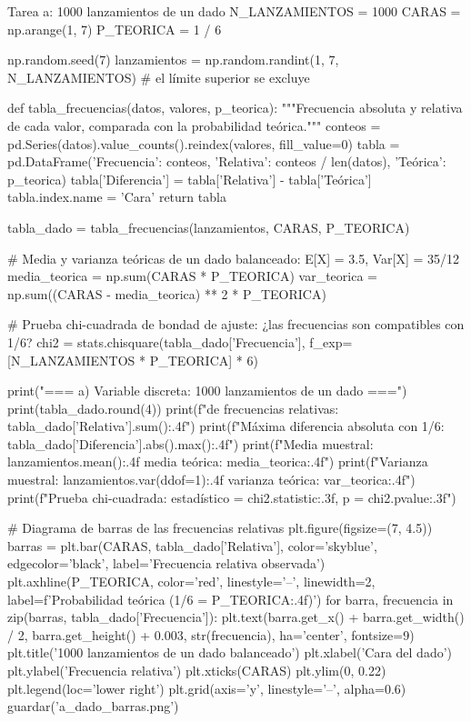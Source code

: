 \documentclass[11pt,letterpaper]{article}
\begin{document}
\begin{codigo}[label=cod:a]{Tarea a: 1000 lanzamientos de un dado}
N_LANZAMIENTOS = 1000
CARAS = np.arange(1, 7)
P_TEORICA = 1 / 6

np.random.seed(7)
lanzamientos = np.random.randint(1, 7, N_LANZAMIENTOS)  # el límite superior se excluye


def tabla_frecuencias(datos, valores, p_teorica):
    """Frecuencia absoluta y relativa de cada valor, comparada con la probabilidad teórica."""
    conteos = pd.Series(datos).value_counts().reindex(valores, fill_value=0)
    tabla = pd.DataFrame({'Frecuencia': conteos,
                          'Relativa': conteos / len(datos),
                          'Teórica': p_teorica})
    tabla['Diferencia'] = tabla['Relativa'] - tabla['Teórica']
    tabla.index.name = 'Cara'
    return tabla


tabla_dado = tabla_frecuencias(lanzamientos, CARAS, P_TEORICA)

# Media y varianza teóricas de un dado balanceado: E[X] = 3.5, Var[X] = 35/12
media_teorica = np.sum(CARAS * P_TEORICA)
var_teorica = np.sum((CARAS - media_teorica) ** 2 * P_TEORICA)

# Prueba chi-cuadrada de bondad de ajuste: ¿las frecuencias son compatibles con 1/6?
chi2 = stats.chisquare(tabla_dado['Frecuencia'], f_exp=[N_LANZAMIENTOS * P_TEORICA] * 6)

print("=== a) Variable discreta: 1000 lanzamientos de un dado ===")
print(tabla_dado.round(4))
print(f"\nSuma de frecuencias relativas: {tabla_dado['Relativa'].sum():.4f}")
print(f"Máxima diferencia absoluta con 1/6: {tabla_dado['Diferencia'].abs().max():.4f}")
print(f"Media muestral: {lanzamientos.mean():.4f}   media teórica: {media_teorica:.4f}")
print(f"Varianza muestral: {lanzamientos.var(ddof=1):.4f}   varianza teórica: {var_teorica:.4f}")
print(f"Prueba chi-cuadrada: estadístico = {chi2.statistic:.3f}, p = {chi2.pvalue:.3f}")

# Diagrama de barras de las frecuencias relativas
plt.figure(figsize=(7, 4.5))
barras = plt.bar(CARAS, tabla_dado['Relativa'], color='skyblue', edgecolor='black',
                 label='Frecuencia relativa observada')
plt.axhline(P_TEORICA, color='red', linestyle='--', linewidth=2,
            label=f'Probabilidad teórica (1/6 = {P_TEORICA:.4f})')
for barra, frecuencia in zip(barras, tabla_dado['Frecuencia']):
    plt.text(barra.get_x() + barra.get_width() / 2, barra.get_height() + 0.003,
             str(frecuencia), ha='center', fontsize=9)
plt.title('1000 lanzamientos de un dado balanceado')
plt.xlabel('Cara del dado')
plt.ylabel('Frecuencia relativa')
plt.xticks(CARAS)
plt.ylim(0, 0.22)
plt.legend(loc='lower right')
plt.grid(axis='y', linestyle='--', alpha=0.6)
guardar('a_dado_barras.png')
\end{codigo}
\end{document}
